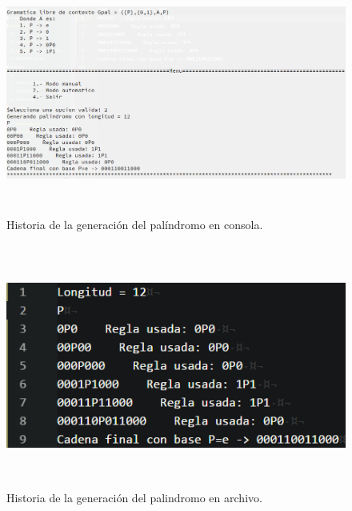	\begin{figure}[H]
		\begin{center}
			\includegraphics[width=\linewidth, height=8cm]{img/palindromo-automatico-consola.png}
			\caption{Historia de la generación del palíndromo en consola.}
			\label{fig:palindromo3}
		\end{center}
	\end{figure}
	\begin{figure}[H]
		\begin{center}
			\includegraphics[width=\linewidth, height=8cm]{img/palindromo-automatico-archivo.png}
			\caption{Historia de la generación del palindromo en archivo.}
			\label{fig:palindromo4}
		\end{center}
	\end{figure}

